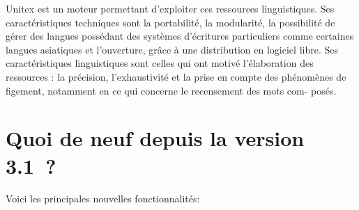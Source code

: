 \bigskip
\noindent Unitex est un moteur permettant d’exploiter ces ressources linguistiques. Ses
caractéristiques techniques sont la portabilité, la modularité, la possibilité de gérer des langues
possédant des systèmes d’écritures particuliers comme certaines langues asiatiques et l’ouverture,
grâce à une distribution en logiciel libre. Ses caractéristiques linguistiques sont celles
qui ont motivé l’élaboration des ressources : la précision, l’exhaustivité et la prise en compte
des phénomènes de figement, notamment en ce qui concerne le recensement des mots com-
posés.




\section*{Quoi de neuf depuis la version 3.1~?}
Voici les principales nouvelles fonctionnalités:
